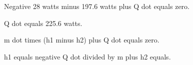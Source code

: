 Negative 28 watts minus 197.6 watts plus Q dot equals zero.  

Q dot equals 225.6 watts.  

m dot times (h1 minus h2) plus Q dot equals zero.  

h1 equals negative Q dot divided by m plus h2 equals.